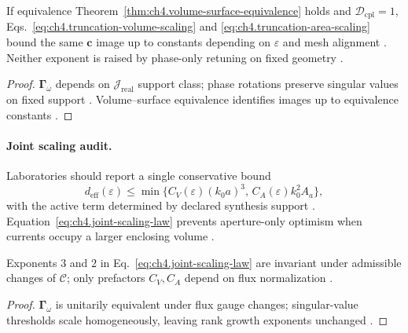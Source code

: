 \begin{proposition}
\label{prop:ch4.truncation-scaling-consistency}
If equivalence Theorem~\ref{thm:ch4.volume-surface-equivalence} holds and \(\mathcal{D}_{\mathrm{cpl}}=1\),
Eqs.~\eqref{eq:ch4.truncation-volume-scaling} and \eqref{eq:ch4.truncation-area-scaling} bound the same \(\mathbf{c}\) image up to
constants depending on \(\varepsilon\) and mesh alignment \cite{stratton1941,harrington2001,collin2001}. Neither exponent is raised by
phase-only retuning on fixed geometry \cite{devaney2004,hansen1988}.
\end{proposition}
\begin{proof}
\(\boldsymbol{\Gamma}_\omega\) depends on \(\mathcal{J}_{\mathrm{real}}\) support class; phase rotations preserve singular values on fixed
support \cite{harrington2001,stratton1941}. Volume--surface equivalence identifies images up to equivalence constants \cite{collin2001}.
\end{proof}

\paragraph{Joint scaling audit.}
Laboratories should report a single conservative bound
\begin{equation}
\label{eq:ch4.joint-scaling-law}
d_{\mathrm{eff}}(\varepsilon)\le\min\big\{C_{V}(\varepsilon)(k_{0}a)^{3},\,C_{A}(\varepsilon)k_{0}^{2}A_{a}\big\},
\end{equation}
with the active term determined by declared synthesis support \cite{stratton1941,hansen1988,harrington2001}. Equation~\eqref{eq:ch4.joint-scaling-law}
prevents aperture-only optimism when currents occupy a larger enclosing volume \cite{devaney2004,collin2001}.

\begin{theorem}
\label{thm:ch4.scaling-gauge-invariant}
Exponents \(3\) and \(2\) in Eq.~\eqref{eq:ch4.joint-scaling-law} are invariant under admissible changes of \(\mathcal{C}\); only
prefactors \(C_{V},C_{A}\) depend on flux normalization \cite{hansen1988,stratton1941,harrington2001}.
\end{theorem}
\begin{proof}
\(\boldsymbol{\Gamma}_\omega\) is unitarily equivalent under flux gauge changes; singular-value thresholds scale homogeneously, leaving rank
growth exponents unchanged \cite{hansen1988,harrington2001}.
\end{proof}

